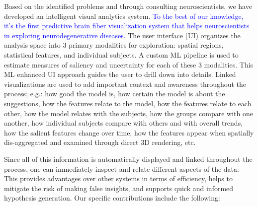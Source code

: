 Based on the identified problems and through consulting neuroscientists, we have developed an 
intelligent visual analytics system. \textcolor{blue}{To the best of our knowledge, it's the first predictive brain fiber visualization system that helps neuroscientists in exploring neurodegenerative diseases.} The user interface (UI) organizes the analysis space into 3 primary modalities for exploration: spatial regions, statistical features, and individual subjects. A custom ML pipeline is used to estimate measures of saliency and uncertainty for each of these 3 modalities. 
This ML enhanced UI approach guides the user to drill down into details. Linked visualizations are used to add important context and awareness throughout the process; e.g.: how good the model is, how certain the model is about the suggestions, how the features relate to the model, how the features relate to each other, how the model relates with the subjects, how the groups compare with one another, how individual subjects compare with others and with overall trends, how the salient features change over time, how the features appear when spatially dis-aggregated and examined through direct 3D rendering, etc. 

Since all of this information is automatically displayed and linked throughout the process, one can immediately inspect and relate different aspects of the data. This provides advantages over other systems in terms of efficiency, helps to mitigate the risk of making false insights, and supports quick and informed hypothesis generation. Our specific contributions include the following:


